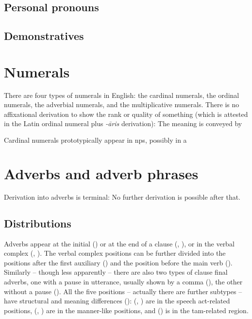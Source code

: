 \documentclass[UTF8, a4paper, oneside, scheme=plain]{ctexrep}
\newcommand{\corpus}[1]{\emph{#1}}
\begin{document}
\subsection{Personal pronouns}

\subsection{Demonstratives}

\section{Numerals}

There are four types of numerals in English:
the cardinal numerals, 
the ordinal numerals,
the adverbial numerals,
and the multiplicative numerals.
There is no affixational derivation to show the rank or quality of something 
(which is attested in the Latin ordinal numeral plus \corpus{-āris} derivation):
The meaning is conveyed by 

Cardinal numerals prototypically appear in \acs{np}s,
possibly in a 

\section{Adverbs and adverb phrases}\label{sec:pos.adverb}

Derivation into adverbs is terminal:
No further derivation is possible after that.

\subsection{Distributions}

Adverbs appear at the initial () or
at the end of a clause (, ), 
or in the verbal complex (, ).
The verbal complex positions can be further divided into 
the positions after the first auxiliary ()
and the position before the main verb ().
Similarly -- though less apparently -- 
there are also two types of clause final adverbs,
one with a pause in utterance, usually shown by a comma (),
the other without a pause ().
All the five positions -- actually there are further subtypes -- have structural and meaning differences
():
(, ) 
are in the speech act-related positions,
(, ) 
are in the manner-like positions,
and () 
is in the \acs{tam}-related region.
\end{document}
